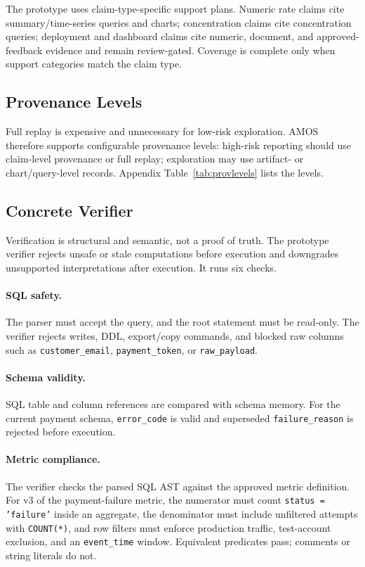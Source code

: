 \documentclass[10pt]{article}
\newcommand{\amos}{\textsc{AMOS}\xspace}
\newcommand{\code}[1]{\texttt{#1}}
\begin{document}
The prototype uses claim-type-specific support plans. Numeric rate claims cite summary/time-series queries and charts; concentration claims cite concentration queries; deployment and dashboard claims cite numeric, document, and approved-feedback evidence and remain review-gated. Coverage is complete only when support categories match the claim type.

\subsection{Provenance Levels}
Full replay is expensive and unnecessary for low-risk exploration. \amos therefore supports configurable provenance levels: high-risk reporting should use claim-level provenance or full replay; exploration may use artifact- or chart/query-level records. Appendix Table~\ref{tab:provlevels} lists the levels.

\subsection{Concrete Verifier}
Verification is structural and semantic, not a proof of truth. The prototype verifier rejects unsafe or stale computations before execution and downgrades unsupported interpretations after execution. It runs six checks.

\paragraph{SQL safety.} The parser must accept the query, and the root statement must be read-only. The verifier rejects writes, DDL, export/copy commands, and blocked raw columns such as \code{customer\_email}, \code{payment\_token}, or \code{raw\_payload}.

\paragraph{Schema validity.} SQL table and column references are compared with schema memory. For the current payment schema, \code{error\_code} is valid and superseded \code{failure\_reason} is rejected before execution.

\paragraph{Metric compliance.} The verifier checks the parsed SQL AST against the approved metric definition. For v3 of the payment-failure metric, the numerator must count \code{status = 'failure'} inside an aggregate, the denominator must include unfiltered attempts with \code{COUNT(*)}, and row filters must enforce production traffic, test-account exclusion, and an \code{event\_time} window. Equivalent predicates pass; comments or string literals do not.
\end{document}
